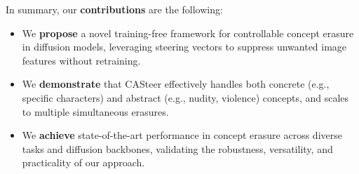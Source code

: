 In summary, our \textbf{contributions} are the following:
\vspace{-0.2cm}
\begin{itemize}
\item We \textbf{propose} a novel training-free framework for controllable concept erasure in diffusion models, leveraging steering vectors to suppress unwanted image features without retraining.
\item We \textbf{demonstrate} that CASteer effectively handles both concrete (e.g., specific characters) and abstract (e.g., nudity, violence) concepts, and scales to multiple simultaneous erasures.
\item We \textbf{achieve} state-of-the-art performance in concept erasure across diverse tasks and diffusion backbones, validating the robustness, versatility, and practicality of our approach.
\end{itemize}

